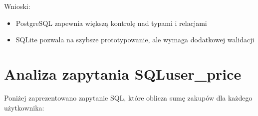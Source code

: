 \documentclass[letterpaper,10pt,english]{sphinxmanual}
\begin{document}
\sphinxAtStartPar
Wnioski:
\begin{itemize}
\item {} 
\sphinxAtStartPar
PostgreSQL zapewnia większą kontrolę nad typami i relacjami

\item {} 
\sphinxAtStartPar
SQLite pozwala na szybsze prototypowanie, ale wymaga dodatkowej walidacji

\end{itemize}


\section{Analiza zapytania SQLuser\_price}
\label{\detokenize{rozdzial4/index:analiza-zapytania-sqluser-price}}
\sphinxAtStartPar
Poniżej zaprezentowano zapytanie SQL, które oblicza sumę zakupów dla każdego użytkownika:

\begin{sphinxVerbatim}[commandchars=\\\{\}]
\end{sphinxVerbatim}
\end{document}
